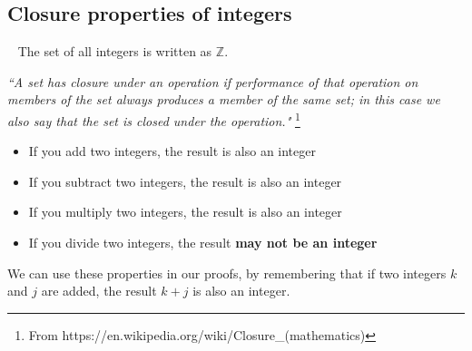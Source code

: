 \documentclass[../Template-Assignment.tex]{subfiles}
\begin{document}
\begin{questionNOGRADE}{\thequestion}
        \end{questionNOGRADE}

    \newpage

    \subsection{Closure properties of integers}

        \begin{intro}{\ }
            The set of all integers is written as $\mathbb{Z}$.

            \begin{center}
                \textit{``A set has closure under an operation if
                performance of that operation on members of the set
                always produces a member of the same set; in this
                case we also say that the set is closed under the operation."}
                \footnote{From https://en.wikipedia.org/wiki/Closure\_(mathematics)}
            \end{center}

            \begin{itemize}
                \item   If you add two integers, the result is also an integer
                \item   If you subtract two integers, the result is also an integer
                \item   If you multiply two integers, the result is also an integer
                \item   If you divide two integers, the result \textbf{may not be an integer}
            \end{itemize}

            We can use these properties in our proofs, by remembering that
            if two integers $k$ and $j$ are added, the result $k+j$ is also an integer.
        \end{intro}
\end{document}
